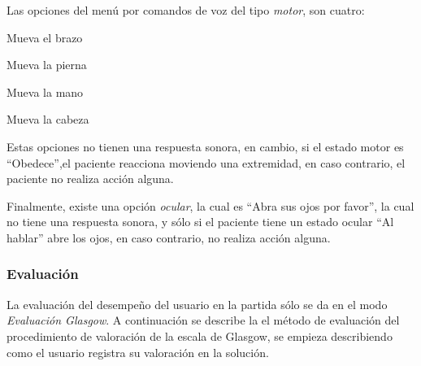 \begin{itemize}
Las opciones del menú por comandos de voz del tipo \emph{motor}, son cuatro: 

\begin{itemize*}
    \item Mueva el brazo
    \item Mueva la pierna
    \item Mueva la mano
    \item Mueva la cabeza
\end{itemize*}

Estas opciones no tienen una respuesta sonora, en cambio, si el estado motor es
\enquote{Obedece},el paciente reacciona moviendo una extremidad, en caso
contrario, el paciente no realiza acción alguna.

Finalmente, existe una opción \emph{ocular}, la cual es \enquote{Abra sus ojos por
favor}, la cual no tiene una respuesta sonora, y sólo si el paciente tiene un
estado ocular \enquote{Al hablar} abre los ojos, en caso contrario, no realiza
acción alguna.

\end{itemize}

\subsubsection{Evaluación}
\label{sec:puntuacion_glasgow}

La evaluación del desempeño del usuario en la partida sólo se da en el modo \emph{Evaluación 
Glasgow}. A continuación se describe la el método de evaluación del procedimiento 
de valoración de la escala  de Glasgow, se empieza describiendo como el 
usuario registra su valoración en la solución.

